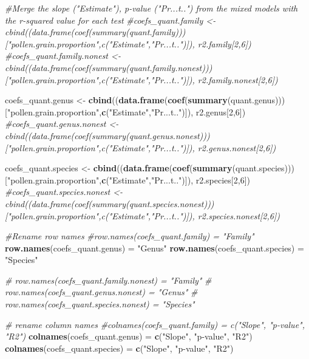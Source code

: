 \documentclass[
]{article}
\newenvironment{Shaded}{\begin{snugshade}}{\end{snugshade}}
\newcommand{\CommentTok}[1]{\textcolor[rgb]{0.56,0.35,0.01}{\textit{#1}}}
\newcommand{\DecValTok}[1]{\textcolor[rgb]{0.00,0.00,0.81}{#1}}
\newcommand{\KeywordTok}[1]{\textcolor[rgb]{0.13,0.29,0.53}{\textbf{#1}}}
\newcommand{\NormalTok}[1]{#1}
\newcommand{\StringTok}[1]{\textcolor[rgb]{0.31,0.60,0.02}{#1}}
\begin{document}
\begin{Shaded}
\begin{Highlighting}[]
\CommentTok{#Merge the slope ("Estimate"), p-value ("Pr...t..") from the mixed models with the r-squared value for each test}
\CommentTok{#coefs_quant.family <- cbind((data.frame(coef(summary(quant.family)))["pollen.grain.proportion",c("Estimate","Pr...t..")]), r2.family[2,6])}
\CommentTok{#coefs_quant.family.nonest <- cbind((data.frame(coef(summary(quant.family.nonest)))["pollen.grain.proportion",c("Estimate","Pr...t..")]), r2.family.nonest[2,6])}

\NormalTok{coefs_quant.genus <-}\StringTok{ }\KeywordTok{cbind}\NormalTok{((}\KeywordTok{data.frame}\NormalTok{(}\KeywordTok{coef}\NormalTok{(}\KeywordTok{summary}\NormalTok{(quant.genus)))[}\StringTok{"pollen.grain.proportion"}\NormalTok{,}\KeywordTok{c}\NormalTok{(}\StringTok{"Estimate"}\NormalTok{,}\StringTok{"Pr...t.."}\NormalTok{)]), r2.genus[}\DecValTok{2}\NormalTok{,}\DecValTok{6}\NormalTok{]) }
\CommentTok{#coefs_quant.genus.nonest <- cbind((data.frame(coef(summary(quant.genus.nonest)))["pollen.grain.proportion",c("Estimate","Pr...t..")]), r2.genus.nonest[2,6]) }

\NormalTok{coefs_quant.species <-}\StringTok{ }\KeywordTok{cbind}\NormalTok{((}\KeywordTok{data.frame}\NormalTok{(}\KeywordTok{coef}\NormalTok{(}\KeywordTok{summary}\NormalTok{(quant.species)))[}\StringTok{"pollen.grain.proportion"}\NormalTok{,}\KeywordTok{c}\NormalTok{(}\StringTok{"Estimate"}\NormalTok{,}\StringTok{"Pr...t.."}\NormalTok{)]), r2.species[}\DecValTok{2}\NormalTok{,}\DecValTok{6}\NormalTok{]) }
\CommentTok{#coefs_quant.species.nonest <- cbind((data.frame(coef(summary(quant.species.nonest)))["pollen.grain.proportion",c("Estimate","Pr...t..")]), r2.species.nonest[2,6])}

\CommentTok{#Rename row names }
\CommentTok{#row.names(coefs_quant.family) = "Family"}
\KeywordTok{row.names}\NormalTok{(coefs_quant.genus) =}\StringTok{ "Genus"}
\KeywordTok{row.names}\NormalTok{(coefs_quant.species) =}\StringTok{ "Species"}

\CommentTok{# row.names(coefs_quant.family.nonest) = "Family"}
\CommentTok{# row.names(coefs_quant.genus.nonest) = "Genus"}
\CommentTok{# row.names(coefs_quant.species.nonest) = "Species"}

\CommentTok{# rename column names }
\CommentTok{#colnames(coefs_quant.family) = c("Slope", "p-value", "R2")}
\KeywordTok{colnames}\NormalTok{(coefs_quant.genus) =}\StringTok{ }\KeywordTok{c}\NormalTok{(}\StringTok{"Slope"}\NormalTok{, }\StringTok{"p-value"}\NormalTok{, }\StringTok{"R2"}\NormalTok{)}
\KeywordTok{colnames}\NormalTok{(coefs_quant.species) =}\StringTok{ }\KeywordTok{c}\NormalTok{(}\StringTok{"Slope"}\NormalTok{, }\StringTok{"p-value"}\NormalTok{, }\StringTok{"R2"}\NormalTok{)}


\end{Highlighting}
\end{Shaded}
\end{document}
